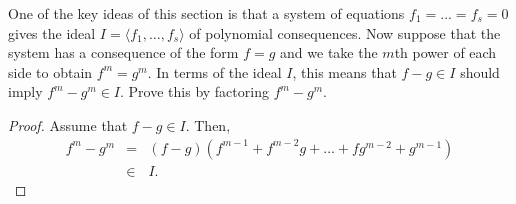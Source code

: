 \begin{exercise}{19}
One of the key ideas of this section is that a system of equations $f_1 = \dots = f_s = 0$ gives the ideal $I=\langle f_1,\dots,f_s\rangle$ of polynomial consequences. Now suppose that the system has a consequence of the form $f=g$ and we take the $m$th power of each side to obtain $f^m = g^m$. In terms of the ideal $I$, this means that $f-g\in I$ should imply $f^m - g^m\in I$. Prove this by factoring $f^m - g^m$.    
\end{exercise}
\begin{proof}
    Assume that $f-g\in I$. Then,
    \begin{eqnarray*}
        f^m - g^m
        & = & (f-g)(f^{m-1} + f^{m-2}g + \dots + fg^{m-2} + g^{m-1})\\
        & \in & I.
    \end{eqnarray*}
\end{proof}































